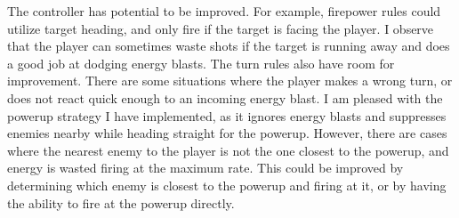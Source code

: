 The controller has potential to be improved. For example, firepower rules could utilize target heading, and only fire if the target is facing the player. I observe that the player can sometimes waste shots if the target is running away and does a good job at dodging energy blasts. The turn rules also have room for improvement. There are some situations where the player makes a wrong turn, or does not react quick enough to an incoming energy blast. I am pleased with the powerup strategy I have implemented, as it ignores energy blasts and suppresses enemies nearby while heading straight for the powerup. However, there are cases where the nearest enemy to the player is not the one closest to the powerup, and energy is wasted firing at the maximum rate. This could be improved by determining which enemy is closest to the powerup and firing at it, or by having the ability to fire at the powerup directly.